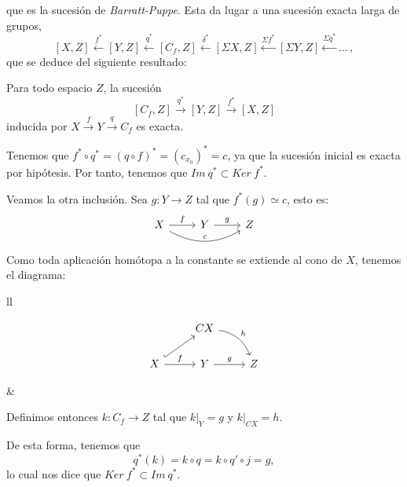 que es la sucesión de \textit{Barratt-Puppe}. Esta da lugar a una sucesión exacta larga de grupos,
\[ [X, Z] \stackrel{f^*}{\longleftarrow} [Y, Z] \stackrel{q^*}{\longleftarrow} [C_f, Z] \stackrel{\delta^*}{\longleftarrow} [\Sigma X, Z] \stackrel{\Sigma f^*}{\longleftarrow} [\Sigma Y, Z] \stackrel{\Sigma q^*}{\longleftarrow} \dots \, , \]
que se deduce del siguiente resultado:
\begin{teor}
Para todo espacio $Z$, la sucesión 
\[ [C_f, Z] \stackrel{q^*}{\longrightarrow} [Y, Z] \stackrel{f^*}{\longrightarrow} [X, Z] \]
inducida por $X \stackrel{f}{\longrightarrow} Y \stackrel{q}{\longrightarrow} C_f$ es exacta.
\end{teor}
\begin{demo}
Tenemos que $ f^* \circ q^* = (q \circ f)^* = (c_{x_0})^* = c$, ya que la sucesión inicial es exacta por hipótesis. Por tanto, tenemos que $Im \ q^* \subset Ker \ f^* $.\par 
Veamos la otra inclusión. Sea $g : Y \longrightarrow Z$ tal que $f^*(g) \simeq c$, esto es:
\[
\begin{tikzcd}
X \rar{f} \arrow[bend right]{rr}{c} & Y \rar{g} & Z
\end{tikzcd}
\]
Como toda aplicación homótopa a la constante se extiende al cono de $X$, tenemos el diagrama: \par
\begin{tabular}{ll}
\begin{minipage}{0.4\textwidth}
\[
\begin{tikzcd}
{} & CX \arrow[bend left]{rd}{h} &  \\
X \rar{f} \arrow[hook]{ur}  & Y \rar{g}  & Z
\end{tikzcd}
\]
\end{minipage}
&
\begin{minipage}{0.55\textwidth}
Definimos entonces $k : C_f \longrightarrow Z$ tal que $k\vert_Y = g$ y $k \vert_{CX} = h$. \par
De esta forma, tenemos que 
\[
q^*(k) = k \circ q = k \circ q' \circ j = g ,
\]
lo cual nos dice que $Ker \ f^* \subset Im \ q^*$.
\end{minipage}
\end{tabular}
\end{demo}

